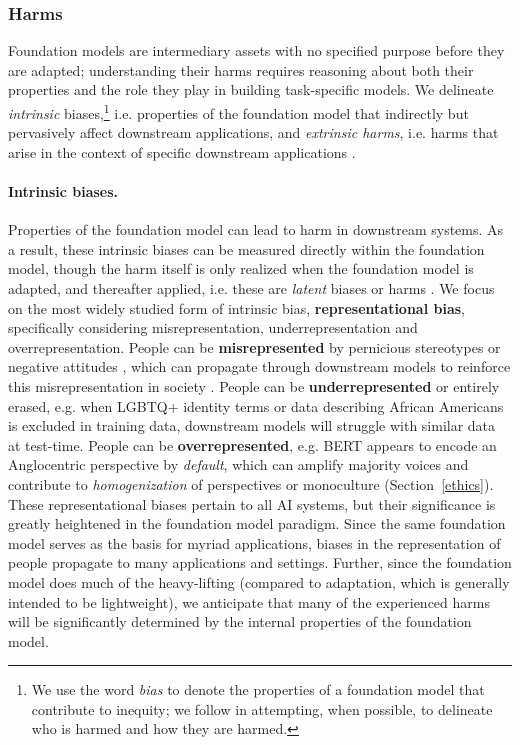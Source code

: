 \subsubsection{Harms}
\label{sec:fairness-harms}
Foundation models are intermediary assets with no specified purpose before they are adapted; understanding their harms requires reasoning about both their properties and the role they play in building task-specific models. We delineate \textit{intrinsic} biases,\footnote{We use the word \textit{bias} to denote the properties of a foundation model that contribute to inequity; we follow \citet{blodgett_language_2020} in attempting, when possible, to delineate who is harmed and how they are harmed.} i.e. properties of the  foundation model that indirectly but pervasively affect downstream applications, and \textit{extrinsic harms}, i.e. harms that arise in the context of specific downstream applications \citep{galliers1993}.

\paragraph{Intrinsic biases.} Properties of the foundation model can lead to harm in downstream systems. As a result, these intrinsic biases can be measured directly within the foundation model, though the harm itself is only realized when the foundation model is adapted, and thereafter applied, i.e. these are \textit{latent} biases or harms \citep{DeCamp2020}. We focus on the most widely studied form of intrinsic bias, \textbf{representational bias}, specifically considering misrepresentation, underrepresentation and overrepresentation. People can be \textbf{misrepresented} by pernicious stereotypes \citep{bolukbasi2016, caliskan2017, abid2021,stereoset,gehman-etal-2020-realtoxicityprompts} or negative attitudes \citep{hutchinson2020}, which can propagate through downstream models to reinforce this misrepresentation in society \cite{noble,benjamin2019}. People can be \textbf{underrepresented} or entirely erased, e.g. when LGBTQ+ identity terms  \citep{Strengers2020, Oliva2021, Tomasev2021} or data describing African Americans \cite{buolamwini2018gender,koenecke2020racial,blodgett17} is excluded in training data, downstream models will struggle with similar data at test-time. People can be \textbf{overrepresented}, e.g. BERT appears to encode an Anglocentric perspective \citep{zhou2021} by \textit{default}, which can amplify majority voices and contribute to \textit{homogenization} of perspectives \citep{creel2021} or monoculture \citep{kleinberg2021} (Section~\ref{ethics}). 
These representational biases pertain to all AI systems, but their significance is greatly heightened in the foundation model paradigm. Since the same foundation model serves as the basis for myriad applications, biases in the representation of people propagate to many applications and settings. Further, since the foundation model does much of the heavy-lifting (compared to adaptation, which is generally intended to be lightweight), we anticipate that many of the experienced harms will be significantly determined by the internal properties of the foundation model.

